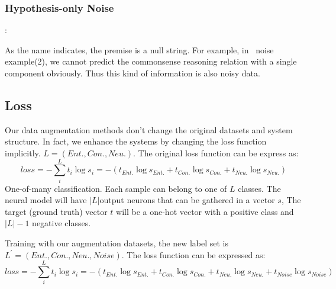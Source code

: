 \subsubsection{Hypothesis-only Noise}:

As the name indicates, the premise is a null string. For example, in~ 
noise example(2), we cannot predict the commonsense reasoning relation with a single component obviously. 
Thus this kind of information is also noisy data. 

\subsection{Loss}
\label{sec:loss}

Our data augmentation methods don't change the original datasets and system structure. 
In fact, we enhance the systems by changing the loss function implicitly. $L=(Ent., Con., Neu.)$.
The original loss function can be express as:
 \begin{equation}
 	loss = -\sum_{i}^{L}t_{i}\log s_{i}=-\left ( t_{Ent.}\log s_{Ent.} + t_{Con.}\log s_{Con.} +  t_{Neu.}\log s_{Neu.}\right )
\end{equation}
One-of-many classification. Each sample can belong to one of  $L$ classes.
 The neural model will have $|L|$output neurons that can be gathered in a vector $s$, 
The target (ground truth) vector $t$ will be a one-hot vector with a positive class and $|L|-1$ negative classes.

Training with our augmentation datasets, the new label set is $L^{'}=(Ent., Con., Neu., Noise)$. The loss function can be expressed as:
 \begin{equation}
 loss = -\sum_{i}^{L}t_{i}\log s_{i}=-\left ( t_{Ent.}\log s_{Ent.} + t_{Con.}\log s_{Con.} +  t_{Neu.}\log s_{Neu.} +  t_{Noise}\log s_{Noise}\right )
\end{equation}

















